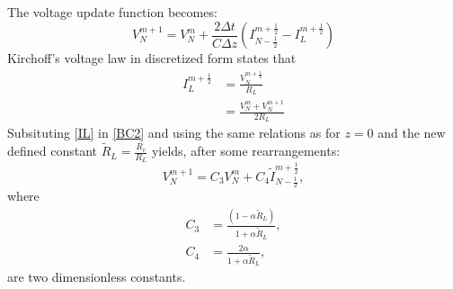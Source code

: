 \documentclass[dutch, a4paper, 11pt]{article}
\begin{document}
\begin{multicols}{2}
\begin{itemize}
    The voltage update function becomes:
    \begin{equation}
        V^{m+1}_{N} = V^{m}_{N} + \frac{2\Delta t}{C\Delta z}\left(I^{m+\frac{1}{2}}_{N-\frac{1}{2}} - I^{m+\frac{1}{2}}_{L}\right)
        \label{BC2}
    \end{equation}
    Kirchoff's voltage law in discretized form states that
    \begin{align}
        I^{m+\frac{1}{2}}_{L} & = \frac{V^{m+\frac{1}{2}}_{N}}{R_{L}}\\
        & = \frac{V^{m}_{N}+V^{m+1}_{N}}{2R_{L}}
        \label{IL}
    \end{align}
    Subsituting \ref{IL} in \ref{BC2} and using the same relations as for $z=0$ and the new defined constant $\tilde{R}_{L} = \frac{R_c}{R_L}$ yields, 
    after some rearrangements:
    \begin{equation}
        V^{m+1}_{N} = C_{3}V^{m}_N + C_{4}\tilde{I}^{m+\frac{1}{2}}_{N-\frac{1}{2}},
    \end{equation}
    where
    \begin{align}
        C_{3} & = \frac{(1-\alpha\tilde{R}_{L})}{1+\alpha\tilde{R}_{L}},\\
        C_{4} & = \frac{2\alpha}{1+\alpha\tilde{R}_{L}},
    \end{align}
    are two dimensionless constants.
\end{itemize}

\end{multicols}
\end{document}
